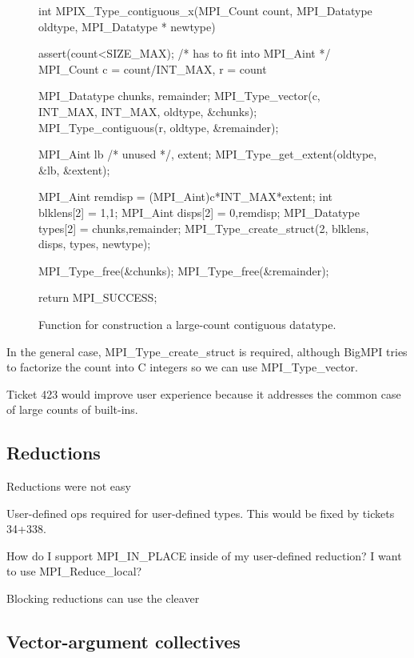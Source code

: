 \begin{figure}
\begin{code}
int MPIX_Type_contiguous_x(MPI_Count count, 
                           MPI_Datatype oldtype, 
                           MPI_Datatype * newtype)
{
    assert(count<SIZE_MAX); /* has to fit into MPI_Aint */
    MPI_Count c = count/INT_MAX, r = count%

    MPI_Datatype chunks, remainder;
    MPI_Type_vector(c, INT_MAX, INT_MAX, oldtype, &chunks);
    MPI_Type_contiguous(r, oldtype, &remainder);

    MPI_Aint lb /* unused */, extent;
    MPI_Type_get_extent(oldtype, &lb, &extent);

    MPI_Aint remdisp          = (MPI_Aint)c*INT_MAX*extent;
    int blklens[2]            = {1,1};
    MPI_Aint disps[2]         = {0,remdisp};
    MPI_Datatype types[2]     = {chunks,remainder};
    MPI_Type_create_struct(2, blklens, disps, types, newtype);

    MPI_Type_free(&chunks);
    MPI_Type_free(&remainder);

    return MPI_SUCCESS;
}
\end{code}
\label{code:type_contig_x}
\caption{Function for construction a large-count contiguous datatype.}
\end{figure}

In the general case, MPI\_Type\_create\_struct is required, although BigMPI tries to factorize the count into C integers so we can use MPI\_Type\_vector.

Ticket 423 would improve user experience because it addresses the common case of large counts of built-ins.

\subsection{Reductions}

Reductions were not easy

User-defined ops required for user-defined types.  This would be fixed by tickets 34+338.

How do I support MPI\_IN\_PLACE inside of my user-defined reduction?
I want to use MPI\_Reduce\_local?

Blocking reductions can use the cleaver 

\subsection{Vector-argument collectives}

